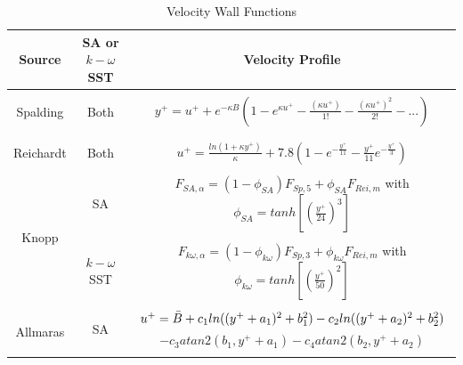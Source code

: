 \begin{table}[htb!]
\centering
\caption{Velocity Wall Functions}
\label{tab:veloctityprofiles}
\begin{tabular}{ccc}
\hline
Source &
SA or $k-\omega$ SST &
Velocity Profile \\ \hline\hline
\\
Spalding \cite{spalding1961single}  &
Both &
$y^+ = u^+ + e^{-\kappa B} (1 - e^{\kappa u^+} - \frac{(\kappa u^+)}{1!} - \frac{(\kappa u^+)^2}{2!} - ...)$ \\ \\

\\

Reichardt \cite{reichardt1951vollstandige} & Both & $u^+ = \frac{ln(1+\kappa y^+)}{\kappa} + 7.8 (1-e^{-\frac{y^+}{11}}-\frac{y^+}{11}e^{-\frac{y^+}{3}})$ \\ \\


\multirow{3}{*}{Knopp \cite{knopp2006grid}} & SA & $F_{SA,\alpha} =(1-\phi_{SA}) F_{Sp,5} +\phi_{SA}F_{Rei,m}$ with $\phi_{SA} = tanh[(\frac{y^+}{24})^3]$\\ \\

& $k-\omega$ SST & $F_{k\omega,\alpha} =(1-\phi_{k\omega}) F_{Sp,3} +\phi_{k\omega}F_{Rei,m}$ with $\phi_{k\omega} = tanh[(\frac{y^+}{50})^2]$\\ \\

\multirow{3}{*}{Allmaras \cite{allmaras2012modifications}} & \multirow{2}{*}{SA} & $u^+ = \Bar{B} + c_1ln((y^+ + a_1)^2 + b_1^2) - c_2ln((y^+ + a_2)^2 + b_2^2)$ \\ & & $- c_3 atan2(b_1,y^+ + a_1) - c_4atan2(b_2,y^+ + a_2)$ \\ \\ 
\hline
\end{tabular}
\end{table}
